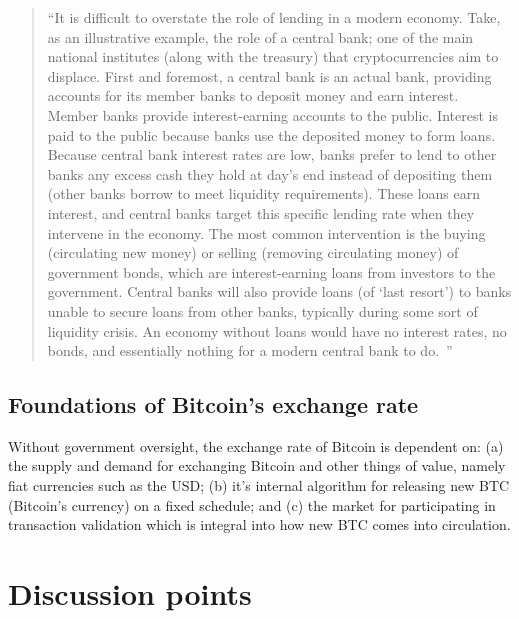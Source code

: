 \begin{quote}

``It is difficult to overstate the role of lending in a modern economy. Take, as an illustrative example, the role of a central bank; one of the main national institutes (along with the treasury) that cryptocurrencies aim to displace. First and foremost, a central bank is an actual bank, providing accounts for its member banks to deposit money and earn interest. Member banks provide interest-earning accounts to the public. Interest is paid to the public because banks use the deposited money to form loans. Because central bank interest rates are low, banks prefer to lend to other banks any excess cash they hold at day's end instead of depositing them (other banks borrow to meet liquidity requirements). These loans earn interest, and central banks target this specific lending rate when they intervene in the economy. The most common intervention is the buying (circulating new money) or selling (removing circulating money) of government bonds, which are interest-earning loans from investors to the government. Central banks will also provide loans (of `last resort') to banks unable to secure loans from other banks, typically during some sort of liquidity crisis. An economy without loans would have no interest rates, no bonds, and essentially nothing for a modern central bank to do.~\cite{okoye2018toward}''

\end{quote}




\subsection{Foundations of Bitcoin's exchange rate}

Without government oversight, the exchange rate of Bitcoin is dependent on: (a) the supply and demand for exchanging Bitcoin and other things of value, namely fiat currencies such as the USD; (b) it's internal algorithm for releasing new BTC (Bitcoin's currency) on a fixed schedule; and (c) the market for participating in transaction validation which is integral into how new BTC comes into circulation.


\section{Discussion points}

